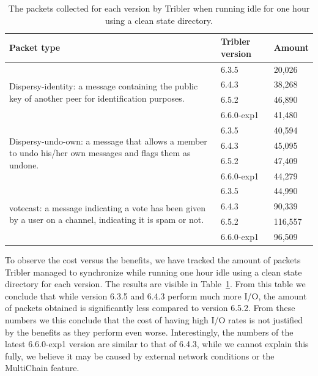 \begin{table}[]
	\centering
	\caption{The packets collected for each version by Tribler when running idle for one hour using a clean state directory.}
	\label{table:packets_collected_idle}
	\begin{tabular}{|p{7.2cm}|l|l|}
		\hline
		\textbf{Packet type}                         & \textbf{Tribler version} & \textbf{Amount}  \\ \hline
		\multirow{4}{*}{\begin{minipage}{7.2cm}Dispersy-identity: a message containing the public key of another peer for identification purposes.\end{minipage}} & 6.3.5           & 20,026  \\ \cline{2-3} 
		& 6.4.3           & 38,268  \\ \cline{2-3} 
		& 6.5.2           & 46,890  \\ \cline{2-3} 
		& 6.6.0-exp1      & 41,480  \\ \hline
		\multirow{4}{*}{\begin{minipage}{7.2cm}Dispersy-undo-own: a message that allows a member to undo his/her own messages and flags them as undone.\end{minipage}} & 6.3.5           & 40,594  \\ \cline{2-3} 
		& 6.4.3           & 45,095  \\ \cline{2-3} 
		& 6.5.2           & 47,409  \\ \cline{2-3} 
		& 6.6.0-exp1      & 44,279  \\ \hline
		\multirow{4}{*}{\begin{minipage}{7.2cm}votecast: a message indicating a vote has been given by a user on a channel, indicating it is spam or not.\end{minipage}}          & 6.3.5           & 44,990  \\ \cline{2-3} 
		& 6.4.3           & 90,339  \\ \cline{2-3} 
		& 6.5.2           & 116,557 \\ \cline{2-3} 
		& 6.6.0-exp1      & 96,509  \\ \hline
	\end{tabular}
\end{table}

To observe the cost versus the benefits, we have tracked the amount of packets Tribler managed to synchronize while running one hour idle using a clean state directory for each version.
The results are visible in Table~\ref{table:packets_collected_idle}.
From this table we conclude that while version 6.3.5 and 6.4.3 perform much more I/O, the amount of packets obtained is significantly less compared to version 6.5.2.
From these numbers we this conclude that the cost of having high I/O rates is not justified by the benefits as they perform even worse. 
Interestingly, the numbers of the latest 6.6.0-exp1 version are similar to that of 6.4.3, while we cannot explain this fully, we believe it may be caused by external network conditions or the MultiChain feature.

